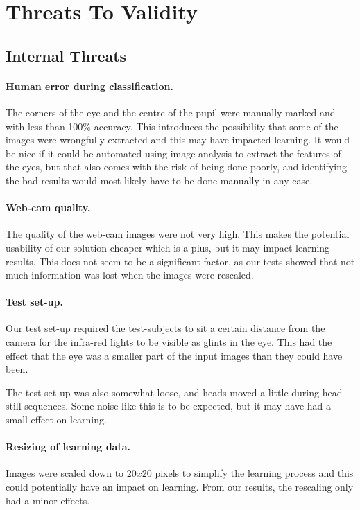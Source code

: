 \section{Threats To Validity}
\subsection{Internal Threats}
\paragraph{Human error during classification.}
The corners of the eye and the centre of the pupil were manually marked and with less than 100\% accuracy.
This introduces the possibility that some of the images were wrongfully extracted and this may have impacted learning.
It would be nice if it could be automated using image analysis to extract the features of the eyes, but that also comes with the risk of being done poorly, and identifying the bad results would most likely have to be done manually in any case.

\paragraph{Web-cam quality.}
The quality of the web-cam images were not very high.
This makes the potential usability of our solution cheaper which is a plus, but it may impact learning results.
This does not seem to be a significant factor, as our tests showed that not much information was lost when the images were rescaled.

\paragraph{Test set-up.}
Our test set-up required the test-subjects to sit a certain distance from the camera for the infra-red lights to be visible as glints in the eye.
This had the effect that the eye was a smaller part of the input images than they could have been.

The test set-up was also somewhat loose, and heads moved a little during head-still sequences.
Some noise like this is to be expected, but it may have had a small effect on learning.

\paragraph{Resizing of learning data.}
Images were scaled down to $20x20$ pixels to simplify the learning process and this could potentially have an impact on learning.
From our results, the rescaling only had a minor effects.

